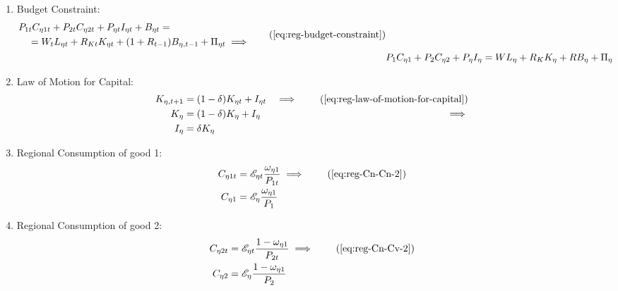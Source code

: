 \documentclass[../thesis.tex]{subfiles}
\begin{document}
\begin{enumerate}

	\item Budget Constraint: 
	\begin{align}
	\begin{split}
		& P_{1 t} C_{\eta 1 t} + P_{2 t} C_{\eta 2 t} + P_{\eta t} I_{\eta t} + B_{\eta t} = \\ & \quad = W_t L_{\eta t} + R_{Kt} K_{\eta t} + (1 + R_{t-1}) B_{\eta,t-1} + \Pi_{\eta t} \implies
	\end{split} \tag{\ref{eq:reg-budget-constraint}}
	\\
	& P_{1} C_{\eta 1} + P_{2} C_{\eta 2} + P_{\eta} I_{\eta} = W L_{\eta} + R_{K} K_{\eta} + R B_{\eta} + \Pi_{\eta} \label{eq:reg-ss-budget-constraint}
	\end{align}

	\item Law of Motion for Capital:
	\begin{alignat}{2}
		K_{\eta, t+1} &= (1-\delta)K_{\eta t} + I_{\eta t} &\implies \tag{\ref{eq:reg-law-of-motion-for-capital}} \\
		K_{\eta} &= (1-\delta)K_{\eta} + I_{\eta} &\implies \nonumber \\
		I_{\eta} &= \delta K_{\eta} \label{eq:reg-ss-law-of-motion-for-capital}
	\end{alignat}

	\item Regional Consumption of good 1:
	\begin{align}
		C_{\eta 1 t} &= \te \frac{\omega_{\eta 1}}{P_{1 t}} \implies \tag{\ref{eq:reg-Cn-Cn-2}} \\
		C_{\eta 1} &= \te[] \frac{\omega_{\eta 1}}{P_{1}} \label{eq:reg-ss-C1-Cn-2}
	\end{align}

	\item Regional Consumption of good 2:
	\begin{align}
		C_{\eta 2 t} &= \te \frac{1 -\omega_{\eta 1}}{P_{2 t}} \implies \tag{\ref{eq:reg-Cn-Cv-2}} \\
		C_{\eta 2} &= \te[] \frac{1 -\omega_{\eta 1}}{P_{2}} \label{eq:reg-ss-C2-Cn-2}
	\end{align}

\begin{comment}
	\item Regional Consumption:
	\begin{align}
		C_{\eta t} &= C_{\eta 1 t}^{\omega_{\eta 1}} C_{\eta 2 t}^{1-\omega_{\eta 1}} \implies \tag{\ref{eq:reg-consumption-aggregation}} \\
		C_{\eta} &= C_{\eta 1}^{\omega_{\eta 1}} C_{\eta 2}^{1-\omega_{\eta 1}} \label{eq:reg-ss-consumption-aggregation}
	\end{align}
	

\end{comment}
\end{enumerate}
\end{document}
